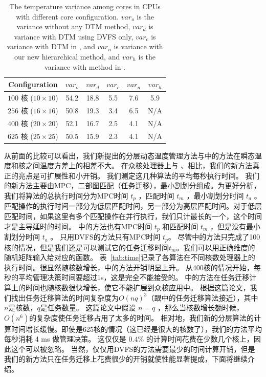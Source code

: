 \begin{table}
\centering
 \caption{The temperature variance among cores in CPUs with different core
   configuration. $var_o$ is the variance without
any DTM method,  
$var_d$ is variance with DTM using DVFS only, 
$var_c$ is variance with DTM in \cite{MaWang:APCCAS'14}, 
and $var_n$ is variance with our
new hierarchical method, and $var_h$ is the variance with method in \cite{Hanumaiah:TCAD'11}. \label{tab:var}}{
 \begin{tabular}{|c|c|c|c|c|c|}
 \hline
 \hline
 Configuration  & $var_o$ & $var_d$ & $var_c$ & $var_n$ & $var_h$ \\
 \hline 
 \hline
 $100$ 核 ($10 \times 10$) & 54.2 & 18.8 & 5.5 & 7.6 & 5.9\\

 \hline
 $256$ 核 ($16 \times 16$) & 50.8 & 19.3 & 3.4 & 6.5 & N/A\\
 \hline
 $400$ 核 ($20 \times 20$) & 52.1 & 16.7 & 2.5 & 4.1 & N/A\\
 \hline
 $625$ 核 ($25 \times 25$) & 50.5 & 15.9 & 2.3 & 4.1 & N/A\\
 \hline
 \hline
 \end{tabular}}
 \end{table}
 
 从前面的比较可以看出，我们新提出的分层动态温度管理方法与\cite{MaWang:APCCAS'14}中的方法在瞬态温度和核之间温度方差上的相差不大。
 在众核处理器上与 \cite{MaWang:APCCAS'14}、\cite{Hanumaiah:TCAD'11}相比，我们的新方法真正的亮点是可扩展性和小开销。
 我们测定这几种算法的平均每秒执行时间。
 我们的新方法主要由MPC，二部图匹配（任务迁移），最小割划分组成。为更好分析，我们将算法的总执行时间分为MPC时间 $t_p$ ，匹配时间 $t_m$ ，最小割划分时间 $t_a$ 。
 匹配操作的执行时间一部分为低层匹配时间，另一部分为高层匹配时间。对于低层匹配时间，如果这里有多个匹配操作在并行执行，我们只计最长的一个，这个时间才是主导延时的时间。
 \cite{MaWang:APCCAS'14}中的方法也有MPC时间 $t_p$ 和匹配时间 $t_m$ ，但是没有最小割划分时间 $t_a$ 。
 只用DVFS的方法只有MPC时间 $t_p$。
 尽管\cite{Hanumaiah:TCAD'11}中的方法只完成了100核的情况，但是我们还是可以测试它的任务迁移时间$t_m$。我们可以用正确维度的随机矩阵输入给对应的函数。
 表~\ref{tab:time}记录了各算法在不同核数处理器上的执行时间。很显然随核数增长，\cite{MaWang:APCCAS'14}中的方法开销明显上升。
 从400核的情况开始，每秒的平均管理决策时间要超过1s，这是完全不能接受的。
 \cite{Hanumaiah:TCAD'11}中的方法在任务迁移计算上的时间也随核数很快增长，使它不能扩展到众核应用中。
 根据这篇论文，我们找出任务迁移算法的时间复杂度为$O(nq)^3$（跟\cite{MaWang:APCCAS'14}中的任务迁移算法接近），其中$n$是核数，$q$是任务数量。
 这篇论文中假设 $n=q$ ，那么当核数增长额时候，$O(n^6)$的复杂度使任务迁移占用了太多的时间。
 相对地，我们新的分层算法的计算时间增长缓慢。即使是625核的情况（这已经是很大的核数了），我们的方法平均每秒消耗 4 ms 做管理决策。
 这仅仅是 $0.4\%$ 的计算时间花费在少数几个核上，因此这个可以被忽略。
 当然，仅仅用DVFS的方法需要最少的时间计算开销，但是我们的新方法只在任务迁移上花费很少的开销就使性能显著提成，下面将继续介绍。
 
